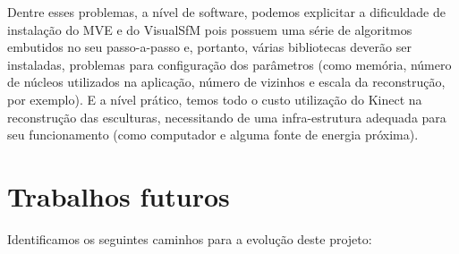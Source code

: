 Dentre esses problemas, a nível de software, podemos explicitar a dificuldade de instalação do MVE e do VisualSfM pois possuem uma série de algoritmos embutidos no seu passo-a-passo e, portanto, várias bibliotecas deverão ser instaladas, problemas para configuração dos parâmetros (como memória, número de núcleos utilizados na aplicação, número de vizinhos e escala da reconstrução, por exemplo). E a nível prático, temos todo o custo utilização do Kinect na reconstrução das esculturas, necessitando de uma infra-estrutura adequada para seu funcionamento (como computador e alguma fonte de energia próxima).

\section{Trabalhos futuros} Identificamos os seguintes caminhos para a evolução deste projeto:
